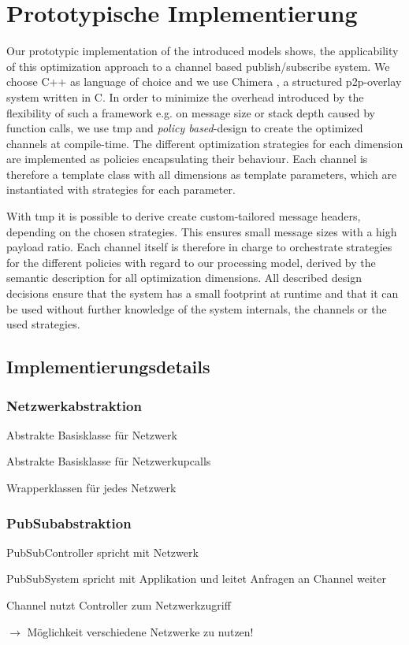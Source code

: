 \chapter{Prototypische Implementierung}
\label{chap:impl}

Our prototypic implementation of the introduced models shows, the applicability of this optimization approach to a channel based publish/subscribe system. We choose C++ as language of choice and we use Chimera \cite{Allen2006Chimera}, a structured p2p-overlay system written in C. In order to minimize the overhead introduced by the flexibility of such a framework e.g. on message size or stack depth caused by function calls, we use \ac{tmp} and \emph{policy based}-design \cite{Alexandrescu2001Modern} to create the optimized channels at compile-time. The different optimization strategies for each dimension are implemented as policies encapsulating their behaviour. Each channel is therefore a template class with all dimensions as template parameters, which are instantiated with strategies for each parameter.  

With \ac{tmp} it is possible to derive create custom-tailored message headers, depending on the chosen strategies. This ensures small message sizes with a high payload ratio. Each channel itself is therefore in charge to orchestrate strategies for the different policies with regard to our processing model, derived by the semantic description for all optimization dimensions. All described design decisions ensure that the system has a small footprint at runtime and that it can be used without further knowledge of the system internals, the channels or the used strategies.



\section{Implementierungsdetails}
\subsection{Netzwerkabstraktion}
\begin{itemize*}
\item Abstrakte Basisklasse für Netzwerk
\item Abstrakte Basisklasse für Netzwerkupcalls
\item Wrapperklassen für jedes Netzwerk
\end{itemize*}


\subsection{PubSubabstraktion}
\begin{itemize*}
\item PubSubController spricht mit Netzwerk
\item PubSubSystem spricht mit Applikation und leitet Anfragen an Channel weiter
\item Channel nutzt Controller zum Netzwerkzugriff
\item $\rightarrow$ Möglichkeit verschiedene Netzwerke zu nutzen!
\end{itemize*}

